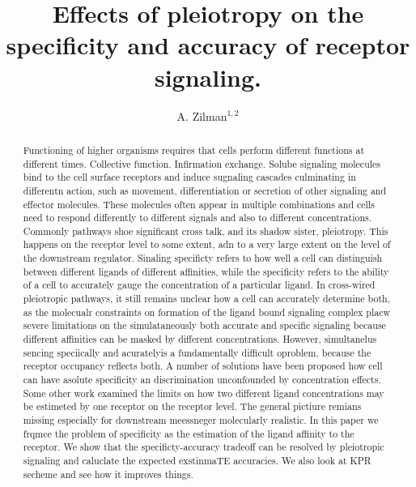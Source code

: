 \documentclass[prl,showpacs]{revtex4}
\begin{document}
\title{Effects of pleiotropy on the specificity and accuracy of receptor signaling.}

\author{A. Zilman$^{1,2}$}

\begin{abstract}
Functioning of higher organisms requires that cells perform different functions at different times. Collective function. Infirmation exchange. Solube signaling molecules bind to the cell surface receptors and induce sugnaling cascades culminating in differentn action, such as movement, differentiation or secretion of other signaling and effector molecules. These molecules often appear in multiple combinations and cells need to respond differently to different signals and also to different concentrations. Commonly pathways shoe significant cross talk, and its shadow sister, pleiotropy. This happens on the receptor level to some extent, adn to a very large extent on the level of the downstream regulator. Sinaling specificty refers to how well a cell can distinguish between different ligands of different affinities, while the specificity refers to the ability of a cell to accurately gauge the concentration of a particular ligand. In cross-wired pleiotropic pathways, it still remains unclear how a cell can accurately determine both, as the molecualr constraints on formation of the ligand bound signaling complex placw severe limitations on the simulataneously both accurate and specific signaling because different affinities can be masked by different concentrations. However, simultanelus sencing speciically and acuratelyis a fundamentally difficult oproblem, because the receptor occupancy reflects both. A number of solutions have been proposed how cell can have asolute specificity an discrimination unconfounded by concentration effects. Some other work examined the limits on how two different ligand concentrations may be estimeted by one receptor on the receptor level. The general pictiure remians missing especially for downstream meessneger molecularly realistic. In this paper we frqmce the problem of specificity as the estimation of the ligand affinity to the receptor. We show that the specificty-accuracy tradeoff can be resolved by pleiotropic signaling and caluclate the expected exstinmaTE accuracies. We also look at KPR secheme and see how it improves things.
\end{abstract}
\end{document}
